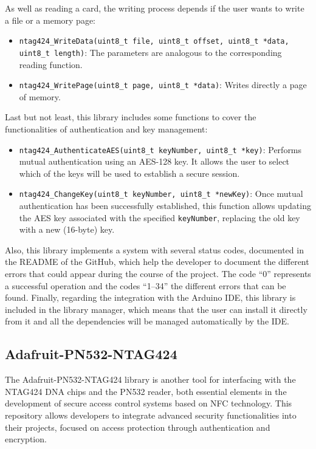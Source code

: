 As well as reading a card, the writing process depends if the user wants to write a file or a memory page:

\begin{itemize}
	\item \texttt{ntag424\_WriteData(uint8\_t file, uint8\_t offset, uint8\_t *data, uint8\_t length)}: The parameters are analogous to the corresponding reading function.
	\item \texttt{ntag424\_WritePage(uint8\_t page, uint8\_t *data)}: Writes directly a page of memory.
\end{itemize}

Last but not least, this library includes some functions to cover the functionalities of authentication and key management:

\begin{itemize}
	\item \texttt{ntag424\_AuthenticateAES(uint8\_t keyNumber, uint8\_t *key)}: Performs mutual authentication using an AES-128 key. It allows the user to select which of the keys will be used to establish a secure session.
	
	\item \texttt{ntag424\_ChangeKey(uint8\_t keyNumber, uint8\_t *newKey)}: Once mutual authentication has been successfully established, this function allows updating the AES key associated with the specified \texttt{keyNumber}, replacing the old key with a new (16-byte) key.
\end{itemize}

Also, this library implements a system with several status codes, documented in the README of the GitHub, which help the developer to document the different errors that could appear during the course of the project. The code ``0'' represents a successful operation and the codes ``1--34'' the different errors that can be found. Finally, regarding the integration with the Arduino IDE, this library is included in the library manager, which means that the user can install it directly from it and all the dependencies will be managed automatically by the IDE.

\subsection{Adafruit-PN532-NTAG424}

The Adafruit-PN532-NTAG424 library \cite{ref27} is another tool for interfacing with the NTAG424 DNA chips and the PN532 reader, both essential elements in the development of secure access control systems based on NFC technology. This repository allows developers to integrate advanced security functionalities into their projects, focused on access protection through authentication and encryption.

